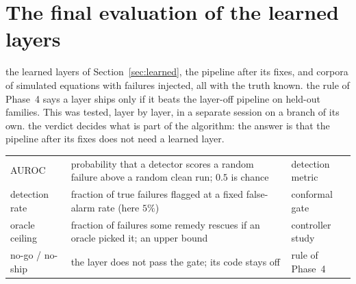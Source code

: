 \section{The final evaluation of the learned layers}\label{sec:final}
\sectionbrief
{the learned layers of Section~\ref{sec:learned}, the pipeline after its fixes, and corpora of simulated equations with failures injected, all with the truth known.}
{the rule of Phase~4 says a layer ships only if it beats the layer-off pipeline on held-out families. This was tested, layer by layer, in a separate session on a branch of its own.}
{the verdict decides what is part of the algorithm: the answer is that the pipeline after its fixes does not need a learned layer.}

\begin{symbols}
\begin{tabular}{@{}L{2.6cm}L{6.0cm}L{4.3cm}@{}}
AUROC & probability that a detector scores a random failure above a random clean run; $0.5$ is chance & detection metric\\
detection rate & fraction of true failures flagged at a fixed false-alarm rate (here $5\%$) & conformal gate\\
oracle ceiling & fraction of failures some remedy rescues if an oracle picked it; an upper bound & controller study\\
no-go / no-ship & the layer does not pass the gate; its code stays off & rule of Phase~4\\
\end{tabular}
\end{symbols}

